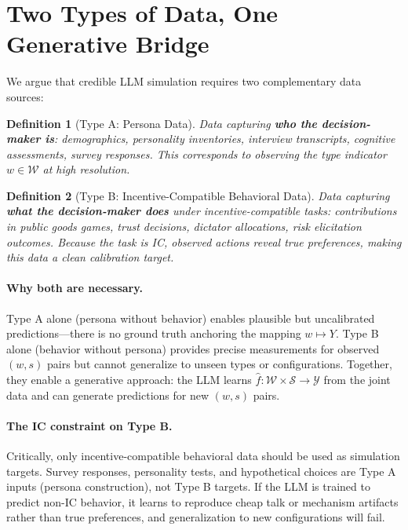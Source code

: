 \documentclass[12pt]{article}
\newtheorem{definition}{Definition}
\newcommand{\fhat}{\hat{f}}
\begin{document}
\section{Two Types of Data, One Generative Bridge}
\label{sec:two_data}

We argue that credible LLM simulation requires two complementary data sources:

\begin{definition}[Type A: Persona Data]
Data capturing \textbf{who the decision-maker is}: demographics, personality inventories, interview transcripts, cognitive assessments, survey responses. This corresponds to observing the type indicator $w \in \mathcal{W}$ at high resolution.
\end{definition}

\begin{definition}[Type B: Incentive-Compatible Behavioral Data]
Data capturing \textbf{what the decision-maker does} under incentive-compatible tasks: contributions in public goods games, trust decisions, dictator allocations, risk elicitation outcomes. Because the task is IC, observed actions reveal true preferences, making this data a clean calibration target.
\end{definition}

\paragraph{Why both are necessary.}
Type A alone (persona without behavior) enables plausible but uncalibrated predictions---there is no ground truth anchoring the mapping $w \mapsto Y$. Type B alone (behavior without persona) provides precise measurements for observed $(w, s)$ pairs but cannot generalize to unseen types or configurations. Together, they enable a generative approach: the LLM learns $\fhat: \mathcal{W} \times \mathcal{S} \to \mathcal{Y}$ from the joint data and can generate predictions for new $(w, s)$ pairs.

\paragraph{The IC constraint on Type B.}
Critically, only incentive-compatible behavioral data should be used as simulation targets. Survey responses, personality tests, and hypothetical choices are Type A inputs (persona construction), not Type B targets. If the LLM is trained to predict non-IC behavior, it learns to reproduce cheap talk or mechanism artifacts rather than true preferences, and generalization to new configurations will fail.
\end{document}
